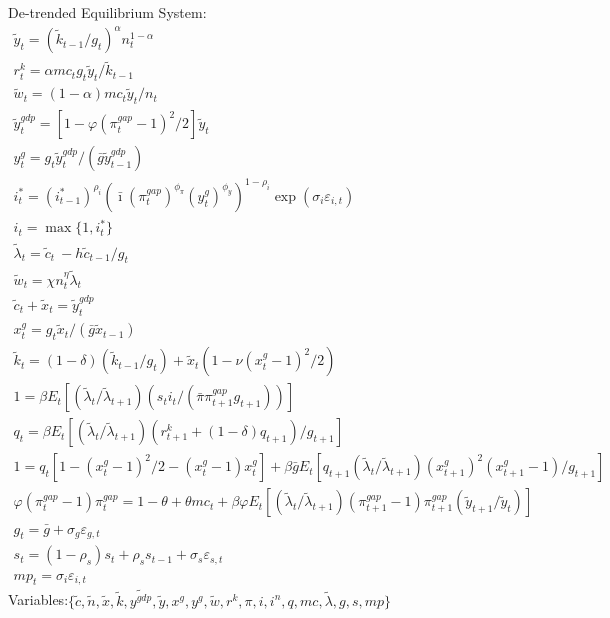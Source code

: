 \documentclass[12pt, final]{article}
\begin{document}
\setcounter{equation}{0}
\noindent De-trended Equilibrium System:
\small\begin{gather}
\tilde{y}_t= (\tilde{k}_{t-1}/g_t)^\alpha n_t^{1-\alpha}\\
r^k_t = \alpha mc_t g_t \tilde{y}_t/\tilde{k}_{t-1}\\
\tilde{w}_t = (1-\alpha)mc_t\tilde{y}_t/n_t\\
\tilde{y}^{gdp}_t = [1-\varphi(\pi_t^{gap} - 1)^2/2]\tilde{y}_t\\
y^g_t = g_t\tilde{y}^{gdp}_t/(\bar{g}\tilde{y}^{gdp}_{t-1})\\
i_t^*=(i^*_{t-1})^{\rho_i}(\bar{\imath}(\pi_t^{gap})^{\phi_\pi}(y^g_t)^{\phi_y})^{1-\rho_i}\exp(\sigma_i\varepsilon_{i,t})\\
i_t=\max\{1,i_t^*\}\\
\tilde{\lambda}_t = \tilde{c}_t\ - h\tilde{c}_{t-1}/g_t\\
\tilde{w}_t = \chi n_t^\eta \tilde{\lambda}_t  \\
\tilde{c}_t + \tilde{x}_t = \tilde{y}^{gdp}_t\\
x^g_t = g_t\tilde{x}_t/(\bar{g}\tilde{x}_{t-1})\\
\tilde{k}_t = (1-\delta)(\tilde{k}_{t-1}/g_t) + \tilde{x}_t(1-\nu(x^g_t-1)^2/2)\\%
  1 = \beta E_t[(\tilde{\lambda}_t/\tilde{\lambda}_{t+1})(s_ti_t/(\bar{\pi}\pi_{t+1}^{gap}g_{t+1}))]\\
q_t = \beta E_t[(\tilde{\lambda}_t/\tilde{\lambda}_{t+1})(r^k_{t+1} + (1-\delta)q_{t+1})/g_{t+1}]\\
1 = q_t[1 - (x^g_t-1)^2/2 - (x^g_t-1)x^g_t] + \beta\bar{g}E_t[q_{t+1}(\tilde{\lambda}_t/\tilde{\lambda}_{t+1})(x^g_{t+1})^2(x^g_{t+1}-1)/g_{t+1}]\\
  \varphi(\pi_t^{gap}-1){\pi}_t^{gap} = 1-\theta + \theta mc_t + \beta\varphi E_t[(\tilde{\lambda}_t/\tilde{\lambda}_{t+1}) (\pi_{t+1}^{gap}-1)\pi_{t+1}^{gap}(\tilde{y}_{t+1}/\tilde{y}_t)]\\
  g_t= \bar{g} + \sigma_g\varepsilon_{g,t} \\
  s_t=(1-\rho_s)s_t+\rho_ss_{t-1} + \sigma_s\varepsilon_{s,t}\\
  mp_t = \sigma_i\varepsilon_{i,t}
\end{gather}
Variables:$\{\tilde{c},\tilde{n},\tilde{x},\tilde{k},\tilde{y^{gdp}},\tilde{y},x^g,y^g,\tilde{w},r^k,\pi,i,i^n,q,mc,\tilde{\lambda},g,s,mp\}$\\
\end{document}
